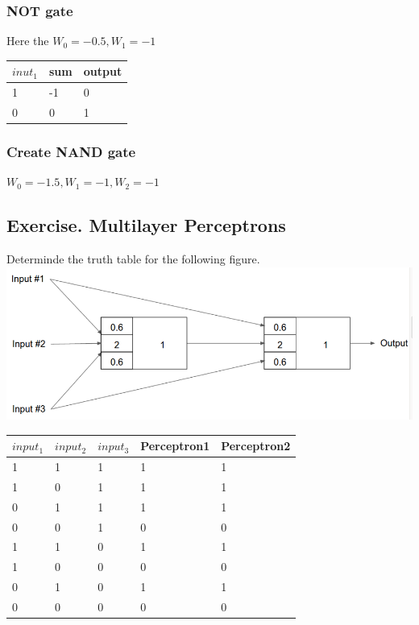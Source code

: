 \documentclass[12pt, a4paper]{article}
\begin{document}
			\subsubsection{NOT gate}
				Here the $W_0=-0.5, W_1=-1$\\
				\begin{table}[h!]
				\begin{tabular}{|l|l|l|}
				\hline
				$inut_1$ & sum & output \\ \hline
				1     & -1   & 0      \\ \hline
				0     & 0   & 1      \\ \hline
				\end{tabular}
				\end{table}	
			\subsubsection{Create NAND gate}
				$W_0=-1.5, W_1=-1, W_2=-1$
		\subsection{Exercise. Multilayer Perceptrons}
			Determinde the truth table for the following figure.\\
			\includegraphics[width=\linewidth]{images/41,6.png}\\
			\begin{table}[]
			\begin{tabular}{|l|l|l|l|l|}
			\hline
			$input_1$ & $input_2$ & $input_3$ & Perceptron1 & Perceptron2 \\ \hline
			1         & 1         & 1         & 1           & 1           \\ \hline
			1         & 0         & 1         & 1           & 1           \\ \hline
			0         & 1         & 1         & 1           & 1           \\ \hline
			0         & 0         & 1         & 0           & 0           \\ \hline
			1         & 1         & 0         & 1           & 1           \\ \hline
			1         & 0         & 0         & 0           & 0           \\ \hline
			0         & 1         & 0         & 1           & 1           \\ \hline
			0         & 0         & 0         & 0           & 0           \\ \hline
			\end{tabular}
			\end{table}
\end{document}
